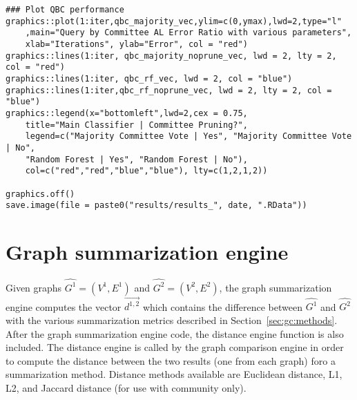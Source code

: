 {\begin{lstlisting}
### Plot QBC performance
graphics::plot(1:iter,qbc_majority_vec,ylim=c(0,ymax),lwd=2,type="l"
	,main="Query by Committee AL Error Ratio with various parameters", 
	xlab="Iterations", ylab="Error", col = "red")
graphics::lines(1:iter, qbc_majority_noprune_vec, lwd = 2, lty = 2, col = "red")
graphics::lines(1:iter, qbc_rf_vec, lwd = 2, col = "blue")
graphics::lines(1:iter,qbc_rf_noprune_vec, lwd = 2, lty = 2, col = "blue")
graphics::legend(x="bottomleft",lwd=2,cex = 0.75,
	title="Main Classifier | Committee Pruning?",
	legend=c("Majority Committee Vote | Yes", "Majority Committee Vote | No",
	"Random Forest | Yes", "Random Forest | No"),
	col=c("red","red","blue","blue"), lty=c(1,2,1,2))

graphics.off()
save.image(file = paste0("results/results_", date, ".RData"))
\end{lstlisting}
}
















\section{Graph summarization engine}
\label{sec:appendicies:gc:engine}

Given graphs $\hat{G^1}=(V^1,E^1)$ and $\hat{G^2}=(V^2,E^2)$, the graph 
summarization engine computes the vector $\overrightarrow{d^{1,2}}$ which 
contains the difference between $\hat{G^1}$ and $\hat{G^2}$ with the various 
summarization metrics described in Section~\ref{sec:gc:methods}. After the 
graph summarization engine code, the distance engine function is also included. 
The distance engine is called by the graph comparison engine in order to 
compute the distance between the two results (one from each graph) foro a 
summarization method. Distance methods available are Euclidean distance, L1, 
L2, and Jaccard distance (for use with community only).

